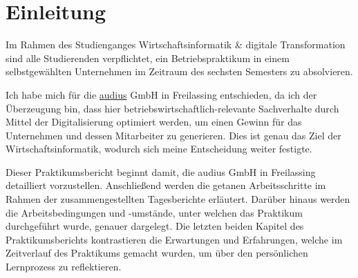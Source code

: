 \section{Einleitung}
\label{sec:einleitung}

Im Rahmen des Studienganges Wirtschaftsinformatik \& digitale Transformation sind alle Studierenden verpflichtet, ein Betriebspraktikum in einem selbstgewählten Unternehmen im Zeitraum des sechsten Semesters zu absolvieren.

Ich habe mich für die \href{https://www.audius.de/de}{audius} GmbH in Freilassing entschieden, da ich der Überzeugung bin, dass hier betriebswirtschaftlich-relevante Sachverhalte durch Mittel der Digitalisierung optimiert werden, um einen Gewinn für das Unternehmen und dessen Mitarbeiter zu generieren. Dies ist genau das Ziel der Wirtschaftsinformatik, wodurch sich meine Entscheidung weiter festigte.

Dieser Praktikumsbericht beginnt damit, die audius GmbH in Freilassing detailliert vorzustellen. Anschließend werden die getanen Arbeitsschritte im Rahmen der zusammengestellten Tagesberichte erläutert. Darüber hinaus werden die Arbeitsbedingungen und -umstände, unter welchen das Praktikum durchgeführt wurde, genauer dargelegt. Die letzten beiden Kapitel des Praktikumsberichts kontrastieren die Erwartungen und Erfahrungen, welche im Zeitverlauf des Praktikums gemacht wurden, um über den persönlichen Lernprozess zu reflektieren.
